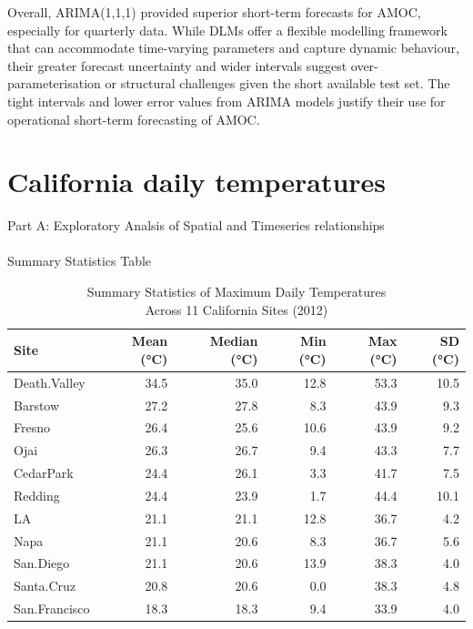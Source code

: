\documentclass[
  11pt,
]{article}
\makeatletter
\let\oldparagraph\paragraph
\renewcommand{\paragraph}{
    \@ifstar
      \xxxParagraphStar
      \xxxParagraphNoStar
  }
\newcommand{\xxxParagraphStar}[1]{\oldparagraph*{#1}\mbox{}}
\newcommand{\xxxParagraphNoStar}[1]{\oldparagraph{#1}\mbox{}}
\makeatother
\begin{document}
Overall, ARIMA(1,1,1) provided superior short-term forecasts for AMOC,
especially for quarterly data. While DLMs offer a flexible modelling
framework that can accommodate time-varying parameters and capture
dynamic behaviour, their greater forecast uncertainty and wider
intervals suggest over-parameterisation or structural challenges given
the short available test set. The tight intervals and lower error values
from ARIMA models justify their use for operational short-term
forecasting of AMOC.

\section{California daily
temperatures}\label{california-daily-temperatures}

Part A: Exploratory Analsis of Spatial and Timeseries relationships

\paragraph{Summary Statistics Table}\label{summary-statistics-table}

\begin{table}
\caption*{
{\large Summary Statistics of Maximum Daily Temperatures} \\ 
{\small Across 11 California Sites (2012)}
} 
\fontsize{12.0pt}{14.4pt}\selectfont
\begin{tabular*}{\linewidth}{@{\extracolsep{\fill}}lrrrrr}
\toprule
Site & Mean (°C) & Median (°C) & Min (°C) & Max (°C) & SD (°C) \\ 
\midrule\addlinespace[2.5pt]
Death.Valley & 34.5 & 35.0 & 12.8 & 53.3 & 10.5 \\ 
Barstow & 27.2 & 27.8 & 8.3 & 43.9 & 9.3 \\ 
Fresno & 26.4 & 25.6 & 10.6 & 43.9 & 9.2 \\ 
Ojai & 26.3 & 26.7 & 9.4 & 43.3 & 7.7 \\ 
CedarPark & 24.4 & 26.1 & 3.3 & 41.7 & 7.5 \\ 
Redding & 24.4 & 23.9 & 1.7 & 44.4 & 10.1 \\ 
LA & 21.1 & 21.1 & 12.8 & 36.7 & 4.2 \\ 
Napa & 21.1 & 20.6 & 8.3 & 36.7 & 5.6 \\ 
San.Diego & 21.1 & 20.6 & 13.9 & 38.3 & 4.0 \\ 
Santa.Cruz & 20.8 & 20.6 & 0.0 & 38.3 & 4.8 \\ 
San.Francisco & 18.3 & 18.3 & 9.4 & 33.9 & 4.0 \\ 
\bottomrule
\end{tabular*}
\end{table}
\end{document}
